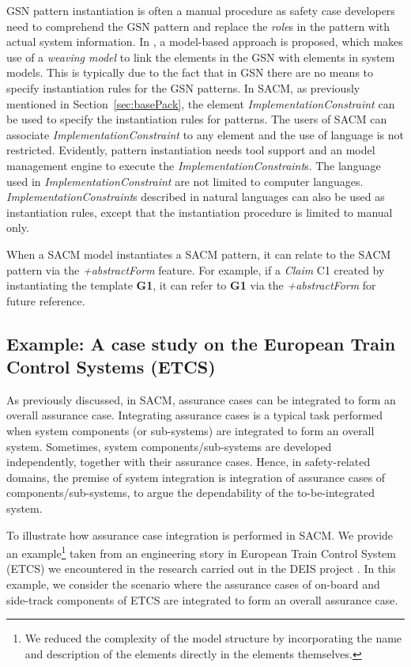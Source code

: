 GSN pattern instantiation is often a manual procedure as safety case developers need to comprehend the GSN pattern and replace the \textit{role}s in the pattern with actual system information. In \cite{hawkins2015weaving}, a model-based approach is proposed, which makes use of a \textit{weaving model} to link the elements in the GSN with elements in system models. 
This is typically due to the fact that in GSN there are no means to specify instantiation rules for the GSN patterns.
In SACM, as previously mentioned in Section~\ref{sec:basePack}, the element \textit{ImplementationConstraint} can be used to specify the instantiation rules for patterns. 
The users of SACM can associate \textit{ImplementationConstraint} to any element and the use of language is not restricted.
Evidently, pattern instantiation needs tool support and an model management engine to execute the \textit{ImplementationConstraint}s. 
The language used in \textit{ImplementationConstraint} are not limited to computer languages.
\textit{ImplementationConstraint}s described in natural languages can also be used as instantiation rules, except that the instantiation procedure is limited to manual only. 

When a SACM model instantiates a SACM pattern, it can relate to the SACM pattern via the \textit{+abstractForm} feature. For example, if a \textit{Claim} C1 created by instantiating the template \textbf{G1}, it can refer to \textbf{G1} via the \textit{+abstractForm} for future reference. 

\subsection{Example: A case study on the European Train Control Systems (ETCS)}
\label{section:etcs}
As previously discussed, in SACM, assurance cases can be integrated to form an overall assurance case. 
Integrating assurance cases is a typical task performed when system components (or sub-systems) are integrated to form an overall system. 
Sometimes, system components/sub-systems are developed independently, together with their assurance cases. 
Hence, in safety-related domains, the premise of system integration is integration of assurance cases of components/sub-systems, to argue the dependability of the to-be-integrated system.

To illustrate how assurance case integration is performed in SACM. 
We provide an example\footnote{We reduced the complexity of the model structure by incorporating the name and description of the elements directly in the elements themselves.} 
taken from an engineering story in European Train Control System (ETCS) we encountered  in the research carried out in the DEIS project \cite{wei2017deis}. 
In this example, we consider the scenario where the assurance cases of on-board and side-track components of ETCS are integrated to form an overall assurance case.
 
